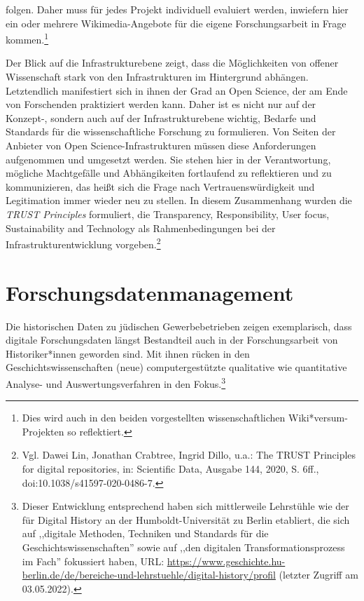 \begin{enumerate}
folgen. Daher muss für jedes Projekt individuell evaluiert werden, inwiefern hier ein oder mehrere Wikimedia-Angebote für die eigene Forschungsarbeit in Frage kommen.\footnote{Dies wird auch in den beiden vorgestellten wissenschaftlichen Wiki*versum-Projekten so reflektiert.}    
\end{enumerate}

Der Blick auf die Infrastrukturebene zeigt, dass die Möglichkeiten von offener Wissenschaft stark von den Infrastrukturen im Hintergrund abhängen. Letztendlich manifestiert sich in ihnen der Grad an Open Science, der am Ende von Forschenden praktiziert werden kann. Daher ist es nicht nur auf der Konzept-, sondern auch auf der Infrastrukturebene wichtig, Bedarfe und Standards für die wissenschaftliche Forschung zu formulieren. Von Seiten der Anbieter von Open Science-Infrastrukturen müssen diese Anforderungen aufgenommen und umgesetzt werden. Sie stehen hier in der Verantwortung, mögliche Machtgefälle und Abhängikeiten fortlaufend zu reflektieren und zu kommunizieren, das heißt sich die Frage nach Vertrauenswürdigkeit und Legitimation immer wieder neu zu stellen. In diesem Zusammenhang wurden die \textit{TRUST Principles} formuliert, die Transparency, Responsibility, User focus, Sustainability and Technology als Rahmenbedingungen bei der Infrastrukturentwicklung vorgeben.\footnote{Vgl. Dawei Lin, Jonathan Crabtree, Ingrid Dillo, u.a.: The TRUST Principles for digital repositories, in: Scientific Data, Ausgabe 144, 2020, S. 6ff., doi:10.1038/s41597-020-0486-7.}

\section{Forschungsdatenmanagement}

Die historischen Daten zu jüdischen Gewerbebetrieben zeigen exemplarisch, dass digitale Forschungsdaten längst Bestandteil auch in der Forschungsarbeit von Historiker*innen geworden sind. Mit ihnen rücken in den Geschichtswissenschaften (neue) computergestützte qualitative wie quantitative Analyse- und Auswertungsverfahren in den Fokus.\footnote{Dieser Entwicklung entsprechend haben sich mittlerweile Lehrstühle wie der für Digital History an der Humboldt-Universität zu Berlin etabliert, die sich auf ,,digitale Methoden, Techniken und Standards für die Geschichtswissenschaften'' sowie auf ,,den digitalen Transformationsprozess im Fach'' fokussiert haben, URL: \url{https://www.geschichte.hu-berlin.de/de/bereiche-und-lehrstuehle/digital-history/profil} (letzter Zugriff am 03.05.2022).}

